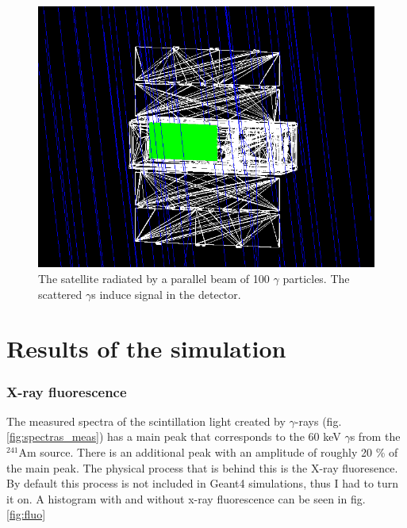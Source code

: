 \documentclass[12pt, a4paper,titlepage]{article}
\numberwithin{equation}{section}
\numberwithin{figure}{section}
\begin{document}
\begin{figure}[h!]
\includegraphics[width=150.0mm]{images/satellite_rad.png}
\caption{The satellite radiated by a parallel beam of 100 $\gamma$ particles. The scattered $\gamma$s induce signal in the detector.}
\end{figure}
\label{fig:sat_rad}

\pagebreak

\section{Results of the simulation}


\subsubsection{X-ray fluorescence}


The measured spectra of the scintillation light created by $\gamma$-rays (fig. \ref{fig:spectras_meas}) has a main peak that corresponds to the 60 keV $\gamma$s from the $^{241}$Am source. There is an additional peak with an amplitude of roughly 20 \% of the main peak. The physical process that is behind this is the X-ray fluoresence. By default this process is not included in Geant4 simulations, thus I had to turn it on. A histogram with and without x-ray fluorescence can be seen in fig. \ref{fig:fluo}
\end{document}
